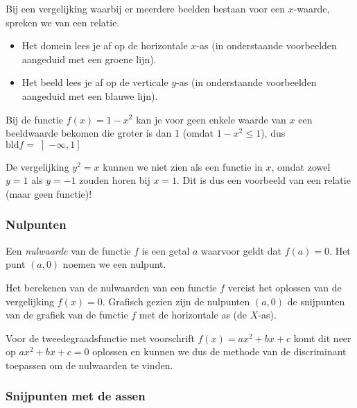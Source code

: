 Bij een vergelijking waarbij er meerdere beelden bestaan voor een $x$-waarde, spreken we van een relatie.

\begin{ftonthoud}
\begin{itemize}
\item Het domein lees je af op de horizontale $x$-as (in onderstaande voorbeelden aangeduid met een groene lijn).
\item Het beeld lees je af op de verticale $y$-as (in onderstaande voorbeelden aangeduid met een blauwe lijn).
\end{itemize}
\end{ftonthoud}


\begin{voorbeeld}
Bij de functie $f(x)=1-x^{2}$ kan je voor geen
enkele waarde van $x$ een beeldwaarde bekomen die groter is dan 1 (omdat $1-x^2 \le 1$),
dus $\textrm{bld}f=\left]-\infty,1\right]$
\end{voorbeeld}

De vergelijking $y^2=x$ kunnen we niet zien als een functie in $x$, omdat zowel $y=1$ als $y=-1$ zouden horen bij $x=1$. Dit is dus een voorbeeld van een relatie (maar geen functie)!

\subsubsection{Nulpunten}

\begin{definitie}
	Een \emph{nulwaarde} van de functie $f$ is een getal $a$ waarvoor geldt dat $f(a)=0$. Het punt $(a,0)$ noemen we een nulpunt.
\end{definitie}

Het berekenen van de nulwaarden van een
functie $f$ vereist het oplossen van de vergelijking $f(x)=0$.
Grafisch gezien zijn de nulpunten $(a,0)$ de snijpunten van de grafiek
van de functie $f$ met de horizontale as (de $X$-as).

\begin{voorbeeld}
	Voor de tweedegraadsfunctie met voorschrift $f(x)=ax^2+bx+c$ komt dit neer op $ax^2+bx+c=0$ oplossen en kunnen we dus de methode van de discriminant toepassen om de nulwaarden te vinden.
\end{voorbeeld}

\subsubsection{Snijpunten met de assen}

